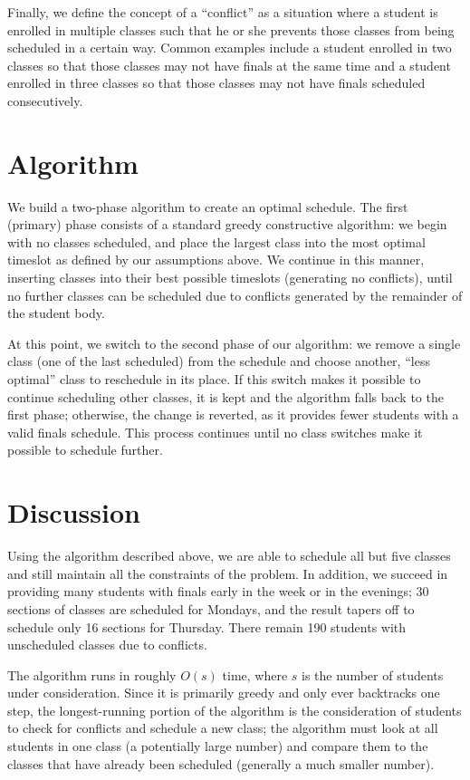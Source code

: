 \documentclass{article}
\begin{document}
Finally, we define the concept of a ``conflict'' as a situation where a student is enrolled in multiple classes such that he or she prevents those classes from being scheduled in a certain way. Common examples include a student enrolled in two classes so that those classes may not have finals at the same time and a student enrolled in three classes so that those classes may not have finals scheduled consecutively.

\section{Algorithm}

We build a two-phase algorithm to create an optimal schedule. The first (primary) phase consists of a standard greedy constructive algorithm: we begin with no classes scheduled, and place the largest class into the most optimal timeslot as defined by our assumptions above. We continue in this manner, inserting classes into their best possible timeslots (generating no conflicts), until no further classes can be scheduled due to conflicts generated by the remainder of the student body.

At this point, we switch to the second phase of our algorithm: we remove a single class (one of the last scheduled) from the schedule and choose another, ``less optimal'' class to reschedule in its place. If this switch makes it possible to continue scheduling other classes, it is kept and the algorithm falls back to the first phase; otherwise, the change is reverted, as it provides fewer students with a valid finals schedule. This process continues until no class switches make it possible to schedule further.

\section{Discussion}

Using the algorithm described above, we are able to schedule all but five classes and still maintain all the constraints of the problem. In addition, we succeed in providing many students with finals early in the week or in the evenings; 30 sections of classes are scheduled for Mondays, and the result tapers off to schedule only 16 sections for Thursday. There remain 190 students with unscheduled classes due to conflicts.

The algorithm runs in roughly $O(s)$ time, where $s$ is the number of students under consideration. Since it is primarily greedy and only ever backtracks one step, the longest-running portion of the algorithm is the consideration of students to check for conflicts and schedule a new class; the algorithm must look at all students in one class (a potentially large number) and compare them to the classes that have already been scheduled (generally a much smaller number).
\end{document}
